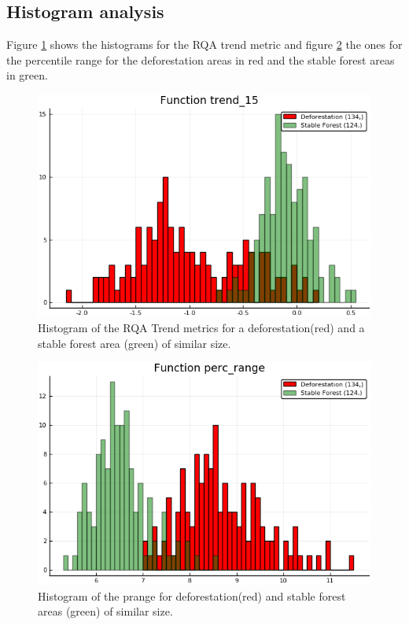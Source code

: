 \documentclass{article}
\begin{document}
\subsection{Histogram analysis}

Figure \ref{histtrend} shows the histograms for the RQA trend metric and figure \ref{histprange} the ones for the percentile range for the deforestation areas in red and the stable forest areas in green.

\begin{figure}
  \includegraphics[width=\textwidth]{figs/histogram_trend1_5_0317_0319_polygon_5.png}
  \caption{Histogram of the RQA Trend metrics for a deforestation(red) and a stable forest area (green) of similar size.}
  \label{histtrend}
\end{figure}


\begin{figure}
  \includegraphics[width=\textwidth]{figs/histogram_percrange_0317_0319_polygon_5.png}
  \caption{Histogram of the prange for deforestation(red) and stable forest areas (green) of similar size.}
  \label{histprange}
\end{figure}
\end{document}
